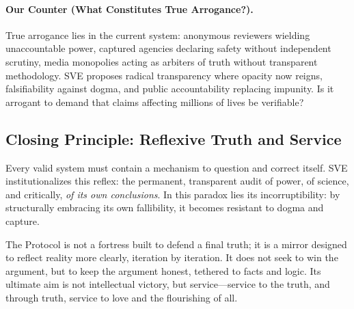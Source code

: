 \documentclass[11pt,a4paper]{article}
\begin{document}
\paragraph{\textbf{Our Counter (What Constitutes True Arrogance?).}} True arrogance lies in the current system: anonymous reviewers wielding unaccountable power, captured agencies declaring safety without independent scrutiny, media monopolies acting as arbiters of truth without transparent methodology. SVE proposes radical transparency where opacity now reigns, falsifiability against dogma, and public accountability replacing impunity. Is it arrogant to demand that claims affecting millions of lives be verifiable?

\vspace{1.5em}

\subsection*{\textcolor{headercolor}{Closing Principle: Reflexive Truth and Service}}

Every valid system must contain a mechanism to question and correct itself. SVE institutionalizes this reflex: the permanent, transparent audit of power, of science, and critically, \textit{of its own conclusions}. In this paradox lies its incorruptibility: by structurally embracing its own fallibility, it becomes resistant to dogma and capture.

The Protocol is not a fortress built to defend a final truth; it is a mirror designed to reflect reality more clearly, iteration by iteration. It does not seek to win the argument, but to keep the argument honest, tethered to facts and logic. Its ultimate aim is not intellectual victory, but service—service to the truth, and through truth, service to love and the flourishing of all.

\vspace{2em}
\end{document}
